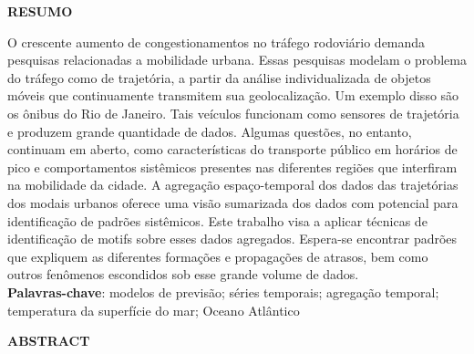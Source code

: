 \documentclass[12pt]{report} %
\begin{document}
	\pagebreak
	
	
	\begin{center}
		{\fontsize{16pt}{\baselineskip}\selectfont \textbf{RESUMO}}\\[2em]
	\end{center}
	
	\justifying 
	\noindent
	O crescente aumento de congestionamentos no tráfego rodoviário demanda pesquisas relacionadas a mobilidade urbana. Essas pesquisas modelam o problema do tráfego como de trajetória, a partir da análise individualizada de objetos móveis que continuamente transmitem sua geolocalização. Um exemplo disso são os ônibus do Rio de Janeiro. Tais veículos funcionam como sensores de trajetória e produzem grande quantidade de dados. Algumas questões, no entanto, continuam em aberto, como características do transporte público em horários de pico e comportamentos sistêmicos presentes nas diferentes regiões que interfiram na mobilidade da cidade. A agregação espaço-temporal dos dados das trajetórias dos modais urbanos oferece uma visão sumarizada dos dados com potencial para identificação de padrões sistêmicos. Este trabalho visa a aplicar técnicas de identificação de motifs sobre esses dados agregados. Espera-se encontrar padrões que expliquem as diferentes formações e propagações de atrasos, bem como outros fenômenos escondidos sob esse grande volume de dados.
	\\[3em]
	
	\normalsize\noindent
	\textbf{Palavras-chave}: modelos de previsão; séries temporais; agregação temporal; temperatura da superfície do mar; Oceano Atlântico
	
	\pagebreak
	
	
	\begin{center}
		{\fontsize{16pt}{\baselineskip}\selectfont \textbf{ABSTRACT}}\\[2em]
	\end{center}
	
\end{document}
